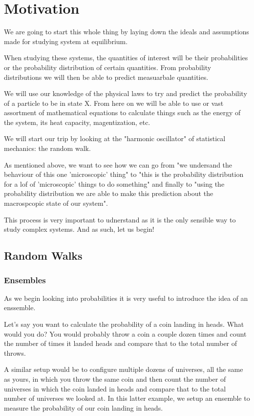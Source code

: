 \chapter{Motivation}
We are going to start this whole thing by laying down the ideals and assumptions made for studying system at equilibrium.

When studying these systems, the quantities of interest will be their probabilities or the probability distribution of certain quantities.
From probability distributions we will then be able to predict measuarbale quantities.

We will use our knowledge of the physical laws to try and predict the probability of a particle to be in state X.
From here on we will be able to use or vast assortment of mathematical equations to calculate things such as the energy of the system, its heat capacity, magentization, etc. 

We will start our trip by looking at the "harmonic oscillator" of statistical mechanics: the random walk.

As mentioned above, we want to see how we can go from "we undersand the behaviour of this one 'microscopic' thing" to "this is the probability distribution for a lof of 'microscopic' things to do something" and finally to "using the probability distribution we are able to make this prediction about the macrospcopic state of our system".

This process is very important to udnerstand as it is the only sensible way to study complex systems.
And as such, let us begin!


\section{Random Walks}

\subsection{Ensembles}
As we begin looking into probabilities it is very useful to introduce the idea of an enssemble.

Let's say you want to calculate the probability of a coin landing in heads.
What would you do?
You would probably throw a coin a couple dozen times and count the number of times it landed heads and compare that to the total number of throws.

A similar setup would be to configure multiple dozens of universes, all the same as yours, in which you throw the same coin and then count the number of universes in which the coin landed in heads and compare that to the total number of universes we looked at.
In this latter example, we setup an ensemble to measure the probability of our coin landing in heads.

